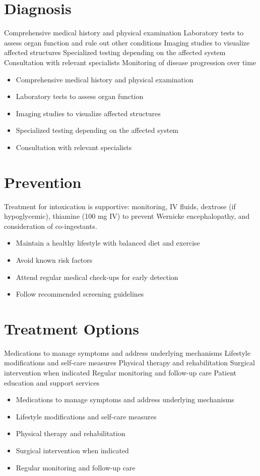 \section{Diagnosis}
Comprehensive medical history and physical examination Laboratory tests to assess organ function and rule out other conditions Imaging studies to visualize affected structures Specialized testing depending on the affected system Consultation with relevant specialists Monitoring of disease progression over time

\begin{itemize}[noitemsep]
  \item Comprehensive medical history and physical examination
  \item Laboratory tests to assess organ function
  \item Imaging studies to visualize affected structures
  \item Specialized testing depending on the affected system
  \item Consultation with relevant specialists
\end{itemize}
\section{Prevention}
Treatment for intoxication is supportive: monitoring, IV fluids, dextrose (if hypoglycemic), thiamine (100 mg IV) to prevent Wernicke encephalopathy, and consideration of co-ingestants.

\begin{itemize}[noitemsep]
  \item Maintain a healthy lifestyle with balanced diet and exercise
  \item Avoid known risk factors
  \item Attend regular medical check-ups for early detection
  \item Follow recommended screening guidelines
\end{itemize}
\section{Treatment Options}
Medications to manage symptoms and address underlying mechanisms Lifestyle modifications and self-care measures Physical therapy and rehabilitation Surgical intervention when indicated Regular monitoring and follow-up care Patient education and support services

\begin{itemize}[noitemsep]
  \item Medications to manage symptoms and address underlying mechanisms
  \item Lifestyle modifications and self-care measures
  \item Physical therapy and rehabilitation
  \item Surgical intervention when indicated
  \item Regular monitoring and follow-up care
\end{itemize}

